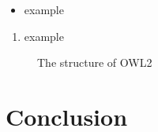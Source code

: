 \documentclass[conference]{IEEEtran}
\begin{document}

\begin{itemize}
\item example
\end {itemize}



    \begin{enumerate}
    \item example

    \end{enumerate}




\begin{figure}[h]
   \centering
    \caption{The structure of OWL2}
    \label{fig:OWL2}
\end{figure}



\section{Conclusion}
\label {conclusion}
%





\end{document}

